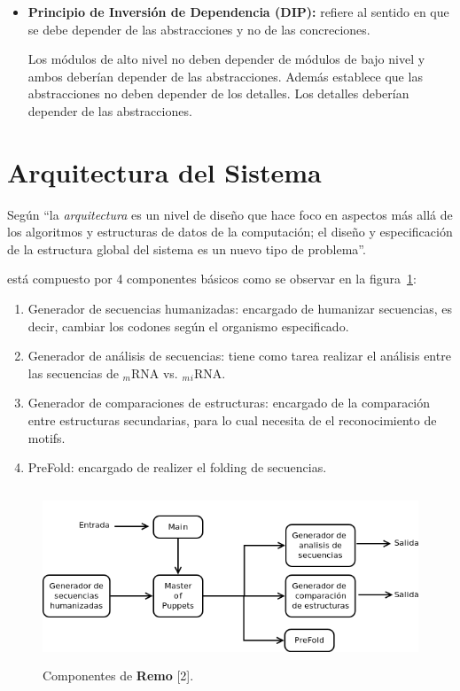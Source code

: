 \begin{itemize}
	\item \textbf{Principio de Inversión de Dependencia (DIP):} refiere al sentido en que se debe depender de las abstracciones y no de las concreciones.
	\par Los módulos de alto nivel no deben depender de módulos de bajo nivel y ambos deberían depender de las abstracciones. Además establece que las abstracciones no deben depender de los detalles. Los detalles deberían depender de las abstracciones. 
\end{itemize}

\section{Arquitectura del Sistema}
\par Según \cite{arquitecturaSistema} ``la \emph{arquitectura} es un nivel de diseño que hace foco en aspectos más allá de los algoritmos y estructuras de datos de la computación; el diseño y especificación de la estructura global del sistema es un nuevo tipo de problema''.

\par \remo está compuesto por 4 componentes básicos como se observar en la figura~\ref{componentesBasicos}:

\begin{enumerate}
	\item Generador de secuencias humanizadas: encargado de humanizar secuencias, es decir, cambiar los codones según el organismo especificado.

	\item Generador de análisis de secuencias: tiene como tarea realizar el análisis entre las secuencias de $_m$RNA vs. $_m$$_i$RNA.

	\item Generador de comparaciones de estructuras: encargado de la comparación entre estructuras secundarias, para lo cual necesita de el reconocimiento de motifs.

	\item PreFold: encargado de realizer el folding de secuencias.

\end{enumerate}

\begin{figure}[!hbtp]
	\begin{center}
		\hspace*{.6cm}\includegraphics[width=12.5cm, height=5.2cm]{image/componenteRemo.png}
		\caption{Componentes de \textbf{Remo} [2].}
		\label{componentesBasicos}
	\end{center}
\end{figure}

